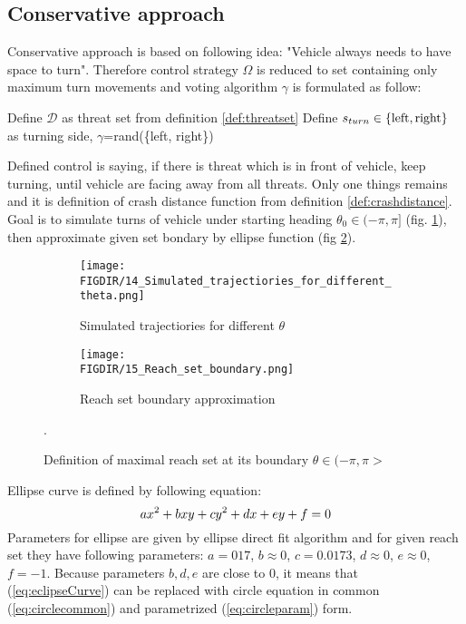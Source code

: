 \subsection{Conservative approach}\label{s:conservativeapproach}
Conservative approach is based on following idea: "Vehicle always needs to have space to turn". Therefore control strategy $\Omega$ is reduced to set containing only maximum turn movements and voting algorithm $\gamma$ is formulated as follow:

\begin{algorithm}[H]
Define $\mathscr{D}$ as threat set from definition \ref{def:threatset} \;
Define $s_{turn} \in \{\textnormal{left},\textnormal{right}\}$ as turning side, $\gamma$=rand(\{left, right\})\;
\end{algorithm}
Defined control is saying, if there is threat which is in front of vehicle, keep turning, until vehicle are facing away from all threats. Only one things remains and it is definition of crash distance function from definition \ref{def:crashdistance}. Goal is to simulate turns of vehicle under starting heading $\theta_0\in(-\pi,\pi]$ (fig. \ref{fig:SimulatedTrajectioriesForDifferentTheta}), then approximate given set bondary by ellipse function (fig \ref{fig:15_ReachSetBoundary}).


\begin{figure}[H]
    \begin{subfigure}{0.5\textwidth}
    \texttt{[image: \\FIGDIR/14\_Simulated\_trajectiories\_for\_different\_theta.png]} 
    \caption{Simulated trajectiories for different $\theta$}
    \label{fig:SimulatedTrajectioriesForDifferentTheta}
    \end{subfigure}
    \begin{subfigure}{0.5\textwidth}
    \texttt{[image: \\FIGDIR/15\_Reach\_set\_boundary.png]}
    \caption{Reach set boundary approximation}
    \label{fig:15_ReachSetBoundary}
    \end{subfigure}
\caption{Definition of maximal reach set at its boundary $\theta \in (-\pi,\pi>$}.
\label{fig:MaximalReachSet}
\end{figure}

Ellipse curve is defined by following equation:
\begin{equation}\label{eq:eclipseCurve}
    ax^2 + bxy + cy^2 + dx+ ey + f = 0\\
\end{equation}
Parameters for ellipse are given by ellipse direct fit algorithm \cite{fitzgibbon1999direct} and for given reach set they have following parameters: $a=017$, $b\approx0$, $c=0.0173$, $d\approx0$, $e\approx0$, $f=-1$. Because parameters $b, d, e$ are close to 0, it means that (\ref{eq:eclipseCurve}) can be replaced with circle equation in common (\ref{eq:circlecommon}) and parametrized (\ref{eq:circleparam}) form.

